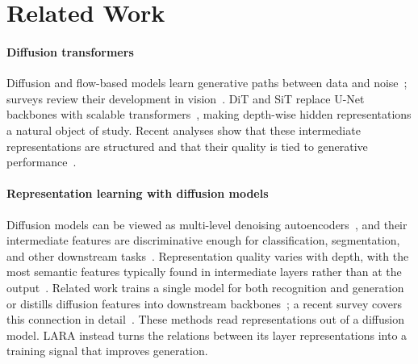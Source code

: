 \section{Related Work}

\paragraph{Diffusion transformers}
Diffusion and flow-based models learn generative paths between data and noise~\citep{ho2020ddpm,song2021score,lipman2022flow}; surveys review their development in vision~\citep{croitoru2023p33}. DiT and SiT replace U-Net backbones with scalable transformers~\citep{peebles2023scalable,ma2024sit}, making depth-wise hidden representations a natural object of study. Recent analyses show that these intermediate representations are structured and that their quality is tied to generative performance~\citep{xiang2023denoising,mukhopadhyay2024,kim2025,stracke2025,an2025inductive}.

\paragraph{Representation learning with diffusion models}
Diffusion models can be viewed as multi-level denoising autoencoders~\citep{vincent2008extracting,song2019generative,ho2020ddpm}, and their intermediate features are discriminative enough for classification, segmentation, and other downstream tasks~\citep{xiang2023denoising,mukhopadhyay2024,kim2025,stracke2025}. Representation quality varies with depth, with the most semantic features typically found in intermediate layers rather than at the output~\citep{xiang2023denoising}. Related work trains a single model for both recognition and generation~\citep{yang2022hybrid,deja2023joint} or distills diffusion features into downstream backbones~\citep{yang2023repfusion,li2023dreamteacher}; a recent survey covers this connection in detail~\citep{fuest2026p12}. These methods read representations out of a diffusion model. LARA instead turns the relations between its layer representations into a training signal that improves generation.

